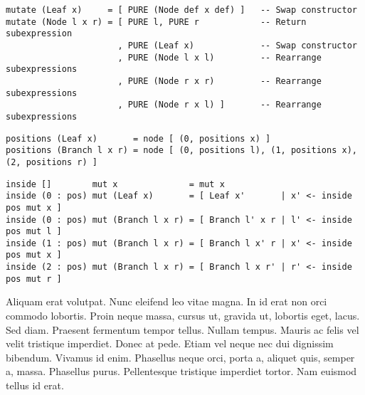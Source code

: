 \documentclass[acmsmall, anonymous]{acmart}
\begin{document}
\begin{verbatim}
mutate (Leaf x)     = [ PURE (Node def x def) ]   -- Swap constructor
mutate (Node l x r) = [ PURE l, PURE r            -- Return subexpression
                      , PURE (Leaf x)             -- Swap constructor
                      , PURE (Node l x l)         -- Rearrange subexpressions
                      , PURE (Node r x r)         -- Rearrange subexpressions
                      , PURE (Node r x l) ]       -- Rearrange subexpressions
\end{verbatim}

\begin{verbatim}
positions (Leaf x)       = node [ (0, positions x) ]
positions (Branch l x r) = node [ (0, positions l), (1, positions x), (2, positions r) ]
\end{verbatim}

\begin{verbatim}
inside []        mut x              = mut x
inside (0 : pos) mut (Leaf x)       = [ Leaf x'       | x' <- inside pos mut x ]
inside (0 : pos) mut (Branch l x r) = [ Branch l' x r | l' <- inside pos mut l ]
inside (1 : pos) mut (Branch l x r) = [ Branch l x' r | x' <- inside pos mut x ]
inside (2 : pos) mut (Branch l x r) = [ Branch l x r' | r' <- inside pos mut r ]
\end{verbatim}


Aliquam erat volutpat. Nunc eleifend leo vitae magna. In id erat non orci
commodo lobortis. Proin neque massa, cursus ut, gravida ut, lobortis eget,
lacus. Sed diam. Praesent fermentum tempor tellus. Nullam tempus. Mauris ac
felis vel velit tristique imperdiet. Donec at pede. Etiam vel neque nec dui
dignissim bibendum. Vivamus id enim. Phasellus neque orci, porta a, aliquet
quis, semper a, massa. Phasellus purus. Pellentesque tristique imperdiet tortor.
Nam euismod tellus id erat.
\end{document}
